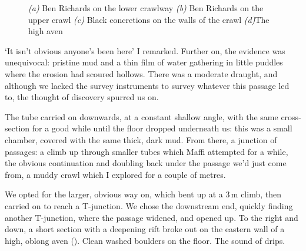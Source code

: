 \begin{figure}[t!]
\checkoddpage \ifoddpage \forcerectofloat \else \forceversofloat \fi
\centering
\begin{subfigure}{0.492\textwidth}
\caption{}
\end{subfigure}
\hfill
\begin{subfigure}{0.492\textwidth}
\caption{}
\end{subfigure}

\vspace{1em}

\begin{subfigure}{0.68\textwidth}
\caption{}
\end{subfigure}
\hfill
\begin{subfigure}{0.301\textwidth}
\caption{}
\end{subfigure}
\vspace{1em}

\caption{\emph{(a)} Ben Richards on the lower  crawlway
\emph{(b)} Ben Richards on the upper  crawl
\emph{(c)} Black concretions on the walls of the crawl
\emph{(d)}The  high aven 
	}\label{fig:cloaca_maxima}
\end{figure}

`It isn't obvious anyone's been here' I remarked. Further on, the evidence was unequivocal: pristine mud and a thin film of water gathering in little puddles where the erosion had scoured hollows. There was a moderate draught, and although we lacked the survey instruments to survey whatever this passage led to, the thought of discovery spurred us on. 

The tube carried on downwards, at a constant shallow angle, with the same cross-section for a good while until the floor dropped underneath us: this was a small chamber, covered with the same thick, dark mud. From there, a junction of passages: a climb up through smaller tubes which Maffi attempted for a while, the obvious continuation and doubling back under the passage we'd just come from, a muddy crawl which I explored for a couple of metres. 

We opted for the larger, obvious way on, which bent up at a 3\,m climb, then carried on to reach a T-junction. We chose the downstream end, quickly finding another T-junction, where the passage widened, and opened up. To the right and down, a short section with a deepening rift broke out on the eastern wall of a high, oblong aven (). Clean washed boulders on the floor. The sound of drips. 


